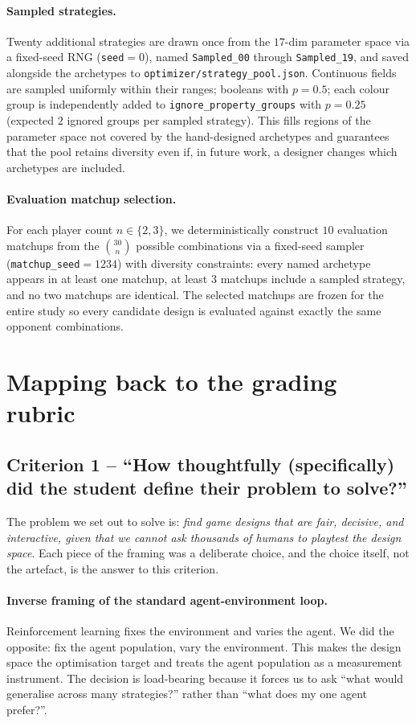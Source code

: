 \documentclass[10pt]{article}
\begin{document}
\paragraph{Sampled strategies.} Twenty additional strategies are drawn
once from the $17$-dim parameter space via a fixed-seed RNG
(\texttt{seed}$=0$), named \texttt{Sampled\_00} through
\texttt{Sampled\_19}, and saved alongside the archetypes to
\texttt{optimizer/strategy\_pool.json}. Continuous fields are sampled
uniformly within their ranges; booleans with $p=0.5$; each colour group
is independently added to \texttt{ignore\_property\_groups} with $p=0.25$
(expected $2$ ignored groups per sampled strategy). This fills regions
of the parameter space not covered by the hand-designed archetypes and
guarantees that the pool retains diversity even if, in future work, a
designer changes which archetypes are included.

\paragraph{Evaluation matchup selection.} For each player count
$n\in\{2,3\}$, we deterministically construct $10$ evaluation matchups
from the $\binom{30}{n}$ possible combinations via a fixed-seed sampler
(\texttt{matchup\_seed}$=1234$) with diversity constraints: every named
archetype appears in at least one matchup, at least $3$ matchups include
a sampled strategy, and no two matchups are identical. The selected
matchups are frozen for the entire study so every candidate design is
evaluated against exactly the same opponent combinations.

\section{Mapping back to the grading rubric}

\subsection*{Criterion 1 -- ``How thoughtfully (specifically) did the
student define their problem to solve?''}

The problem we set out to solve is: \emph{find game designs that
are fair, decisive, and interactive, given that we cannot ask
thousands of humans to playtest the design space}. Each piece of
the framing was a deliberate choice, and the choice itself, not the
artefact, is the answer to this criterion.

\paragraph{Inverse framing of the standard agent-environment loop.}
Reinforcement learning fixes the environment and varies the agent.
We did the opposite: fix the agent population, vary the environment.
This makes the design space the optimisation target and treats the
agent population as a measurement instrument. The decision is
load-bearing because it forces us to ask ``what would generalise
across many strategies?'' rather than ``what does my one agent
prefer?''.
\end{document}

